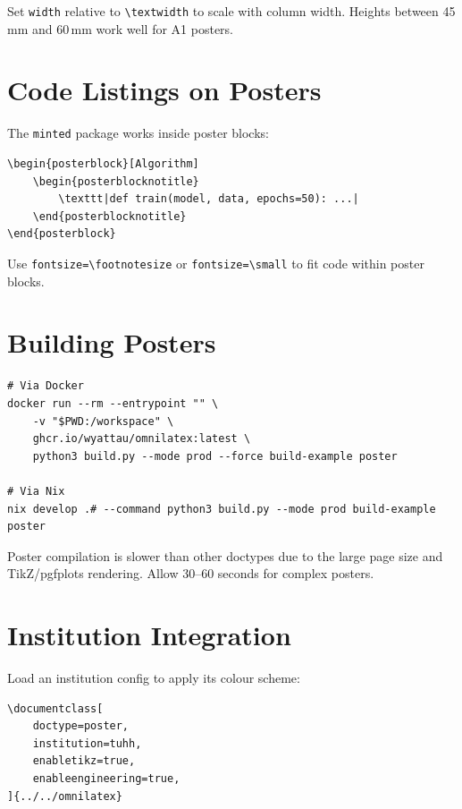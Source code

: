 Set \texttt{width} relative to \texttt{\textbackslash textwidth} to scale
with column width.  Heights between 45\,mm and 60\,mm work well for A1
posters.

\section{Code Listings on Posters}

The \texttt{minted} package works inside poster blocks:

\begin{verbatim}
\begin{posterblock}[Algorithm]
    \begin{posterblocknotitle}
        \texttt|def train(model, data, epochs=50): ...|
    \end{posterblocknotitle}
\end{posterblock}
\end{verbatim}

Use \texttt{fontsize=\textbackslash footnotesize} or
\texttt{fontsize=\textbackslash small} to fit code within poster blocks.

\section{Building Posters}

\begin{verbatim}
# Via Docker
docker run --rm --entrypoint "" \
    -v "$PWD:/workspace" \
    ghcr.io/wyattau/omnilatex:latest \
    python3 build.py --mode prod --force build-example poster

# Via Nix
nix develop .# --command python3 build.py --mode prod build-example poster
\end{verbatim}

Poster compilation is slower than other doctypes due to the large page size
and TikZ/pgfplots rendering.  Allow 30--60 seconds for complex posters.

\section{Institution Integration}

Load an institution config to apply its colour scheme:

\begin{verbatim}
\documentclass[
    doctype=poster,
    institution=tuhh,
    enabletikz=true,
    enableengineering=true,
]{../../omnilatex}
\end{verbatim}

